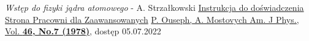 \documentclass[pra,
superscriptaddress,
amssymb,amsmath,amsmath,showpacs,reprint,twocolumn]{revtex4-1}
\begin{document}
\begin{thebibliography}{}
    \textit{Wstęp do fizyki jądra atomowego} - A. Strzałkowski
    \href{https://www.fuw.edu.pl/IIPRACOWNIA/home/Opisy-cwiczen/J14_2018.pdf}{Instrukcja do doświadczenia}
    \href{https://www.fuw.edu.pl/IIPRACOWNIA/home/}{Strona Pracowni dla Zaawansowanych}
    \href{https://www.fuw.edu.pl/IIPRACOWNIA/home/Opisy-cwiczen/J14_2015.09.16_publikacja.pdf}{P. Ouseph, A. Mostovych Am. J Phys., Vol. \bf{46}, No.\bf{7} (1978)}, dostęp 05.07.2022
    
    
    
\end{thebibliography}
\end{document}
